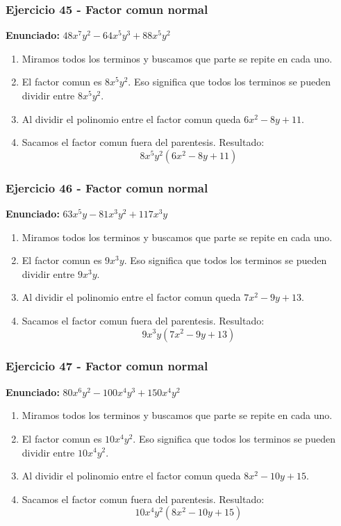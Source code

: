 \documentclass[11pt,a4paper]{article}
\begin{document}
\vspace{0.2cm}
\subsubsection*{Ejercicio 45 - Factor comun normal}
\textbf{Enunciado:} $ 48 x^{7} y^{2} - 64 x^{5} y^{3} + 88 x^{5} y^{2} $\par
\begin{enumerate}[leftmargin=2em]
\item Miramos todos los terminos y buscamos que parte se repite en cada uno.
\item El factor comun es \(8 x^{5} y^{2}\). Eso significa que todos los terminos se pueden dividir entre \(8 x^{5} y^{2}\).
\item Al dividir el polinomio entre el factor comun queda \(6 x^{2} - 8 y + 11\).
\item Sacamos el factor comun fuera del parentesis. Resultado: \[\boxed{8 x^{5} y^{2}\left(6 x^{2} - 8 y + 11\right)}\]
\end{enumerate}

\vspace{0.2cm}
\subsubsection*{Ejercicio 46 - Factor comun normal}
\textbf{Enunciado:} $ 63 x^{5} y - 81 x^{3} y^{2} + 117 x^{3} y $\par
\begin{enumerate}[leftmargin=2em]
\item Miramos todos los terminos y buscamos que parte se repite en cada uno.
\item El factor comun es \(9 x^{3} y\). Eso significa que todos los terminos se pueden dividir entre \(9 x^{3} y\).
\item Al dividir el polinomio entre el factor comun queda \(7 x^{2} - 9 y + 13\).
\item Sacamos el factor comun fuera del parentesis. Resultado: \[\boxed{9 x^{3} y\left(7 x^{2} - 9 y + 13\right)}\]
\end{enumerate}

\vspace{0.2cm}
\subsubsection*{Ejercicio 47 - Factor comun normal}
\textbf{Enunciado:} $ 80 x^{6} y^{2} - 100 x^{4} y^{3} + 150 x^{4} y^{2} $\par
\begin{enumerate}[leftmargin=2em]
\item Miramos todos los terminos y buscamos que parte se repite en cada uno.
\item El factor comun es \(10 x^{4} y^{2}\). Eso significa que todos los terminos se pueden dividir entre \(10 x^{4} y^{2}\).
\item Al dividir el polinomio entre el factor comun queda \(8 x^{2} - 10 y + 15\).
\item Sacamos el factor comun fuera del parentesis. Resultado: \[\boxed{10 x^{4} y^{2}\left(8 x^{2} - 10 y + 15\right)}\]
\end{enumerate}
\end{document}
